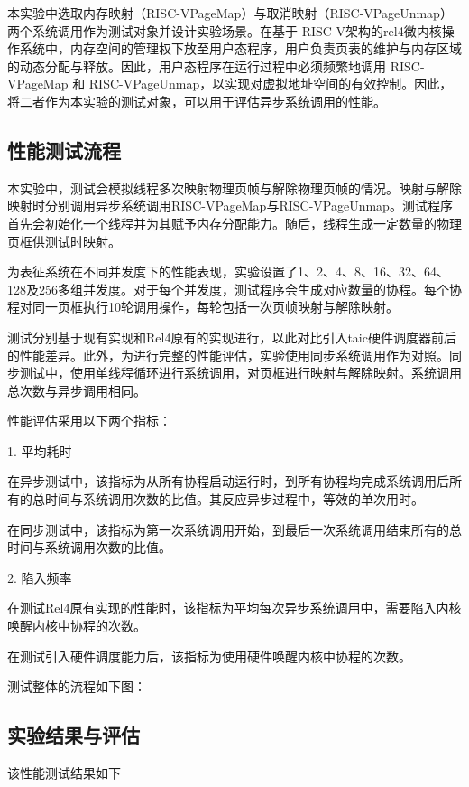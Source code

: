 本实验中选取内存映射（RISC-VPageMap）与取消映射（RISC-VPageUnmap）两个系统调用作为测试对象并设计实验场景。在基于 RISC-V架构的rel4微内核操作系统中，内存空间的管理权下放至用户态程序，用户负责页表的维护与内存区域的动态分配与释放。因此，用户态程序在运行过程中必须频繁地调用 RISC-VPageMap 和 RISC-VPageUnmap，以实现对虚拟地址空间的有效控制。因此，将二者作为本实验的测试对象，可以用于评估异步系统调用的性能。

\subsection{性能测试流程}

本实验中，测试会模拟线程多次映射物理页帧与解除物理页帧的情况。映射与解除映射时分别调用异步系统调用RISC-VPageMap与RISC-VPageUnmap。测试程序首先会初始化一个线程并为其赋予内存分配能力。随后，线程生成一定数量的物理页框供测试时映射。

为表征系统在不同并发度下的性能表现，实验设置了1、2、4、8、16、32、64、128及256多组并发度。对于每个并发度，测试程序会生成对应数量的协程。每个协程对同一页框执行10轮调用操作，每轮包括一次页帧映射与解除映射。

测试分别基于现有实现和Rel4原有的实现进行，以此对比引入taic硬件调度器前后的性能差异。此外，为进行完整的性能评估，实验使用同步系统调用作为对照。同步测试中，使用单线程循环进行系统调用，对页框进行映射与解除映射。系统调用总次数与异步调用相同。

性能评估采用以下两个指标：

1. 平均耗时

在异步测试中，该指标为从所有协程启动运行时，到所有协程均完成系统调用后所有的总时间与系统调用次数的比值。其反应异步过程中，等效的单次用时。

在同步测试中，该指标为第一次系统调用开始，到最后一次系统调用结束所有的总时间与系统调用次数的比值。

2. 陷入频率

在测试Rel4原有实现的性能时，该指标为平均每次异步系统调用中，需要陷入内核唤醒内核中协程的次数。

在测试引入硬件调度能力后，该指标为使用硬件唤醒内核中协程的次数。

测试整体的流程如下图：



\subsection{实验结果与评估}

该性能测试结果如下


